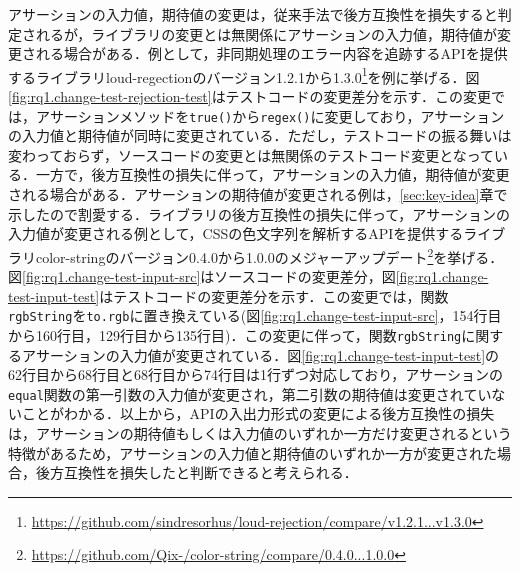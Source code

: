 \documentclass[11pt,dvipdfmx]{jreport}
\begin{document}
アサーションの入力値，期待値の変更は，従来手法で後方互換性を損失すると判定されるが，ライブラリの変更とは無関係にアサーションの入力値，期待値が変更される場合がある．例として，非同期処理のエラー内容を追跡するAPIを提供するライブラリloud-regectionのバージョン1.2.1から1.3.0\footnote{\url{https://github.com/sindresorhus/loud-rejection/compare/v1.2.1...v1.3.0}}を例に挙げる．図\ref{fig:rq1.change-test-rejection-test}はテストコードの変更差分を示す．この変更では，アサーションメソッドを{\verb|true()|}から{\verb|regex()|}に変更しており，アサーションの入力値と期待値が同時に変更されている．ただし，テストコードの振る舞いは変わっておらず，ソースコードの変更とは無関係のテストコード変更となっている．一方で，後方互換性の損失に伴って，アサーションの入力値，期待値が変更される場合がある．アサーションの期待値が変更される例は，\ref{sec:key-idea}章で示したので割愛する．ライブラリの後方互換性の損失に伴って，アサーションの入力値が変更される例として，CSSの色文字列を解析するAPIを提供するライブラリcolor-stringのバージョン0.4.0から1.0.0のメジャーアップデート\footnote{\url{https://github.com/Qix-/color-string/compare/0.4.0...1.0.0}}を挙げる．図\ref{fig:rq1.change-test-input-src}はソースコードの変更差分，図\ref{fig:rq1.change-test-input-test}はテストコードの変更差分を示す．この変更では，関数{\verb|rgbString|}を{\verb|to.rgb|}に置き換えている(図\ref{fig:rq1.change-test-input-src}，154行目から160行目，129行目から135行目)．この変更に伴って，関数{\verb|rgbString|}に関するアサーションの入力値が変更されている．図\ref{fig:rq1.change-test-input-test}の62行目から68行目と68行目から74行目は1行ずつ対応しており，アサーションの{\verb|equal|}関数の第一引数の入力値が変更され，第二引数の期待値は変更されていないことがわかる．以上から，APIの入出力形式の変更による後方互換性の損失は，アサーションの期待値もしくは入力値のいずれか一方だけ変更されるという特徴があるため，アサーションの入力値と期待値のいずれか一方が変更された場合，後方互換性を損失したと判断できると考えられる．
\end{document}
